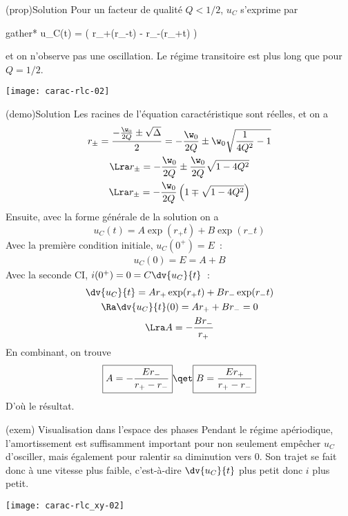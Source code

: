 \documentclass[../../main/main.tex]{subfiles}
\begin{document}
\begin{tcb}[label=prop:solupseudoper, sidebyside](prop){Solution}
	Pour un facteur de qualité $Q < 1/2$, $u_C$ s'exprime par
	\begin{empheq}[box=\fbox]{gather*}
		u_C(t) =  \left( r_+\exp(r_-t) - r_-\exp(r_+t) \right)
	\end{empheq}
	et on n'observe pas une oscillation. Le régime transitoire est plus long que
	pour $Q = 1/2$.
	\tcblower
	\begin{center}
		\texttt{[image: carac-rlc-02]}
	\end{center}
\end{tcb}
\begin{tcb}[label=demo:solupseudoper, sidebyside](demo){Solution}
	Les racines de l'équation caractéristique sont réelles, et on a
	\begin{gather*}
		r_\pm = \frac{- \frac{\w_0}{2Q}\pm\sqrt{\Delta}}{2} = - \frac{\w_0}{2Q}
		\pm \w_0\sqrt{\frac{1}{4Q^2} -1}\\
		\Lra r_\pm = - \frac{\w_0}{2Q} \pm \frac{\w_0}{2Q} \sqrt{1 -
			4Q^2}\\
		\Lra r_\pm = - \frac{\w_0}{2Q} \left( 1 \mp \sqrt{1 -
			4Q^2} \right)
	\end{gather*}
	Ensuite, avec la forme générale de la
	solution on a
	\begin{equation*}
		u_C(t) = A \exp(r_+t) + B\exp(r_-t)
	\end{equation*}
	Avec la première condition initiale, $u_C(0^+) = E$~:
	\begin{gather*}
		u_C(0) = E = A + B
	\end{gather*}
	\tcblower
	Avec la seconde CI, $i(0^+) = 0 = C\dv{u_C}{t}$~:
	\begin{gather*}
		\dv{u_C}{t} = Ar_+ \exp(r_+t) + Br_-\exp(r_-t)\\
		\Ra \dv{u_C}{t} (0) = Ar_+ + Br_- = 0\\
		\Lra A = - \frac{Br_-}{r_+}
	\end{gather*}
	En combinant, on trouve
	\begin{equation*}
		\boxed{A = - \frac{Er_-}{r_+ - r_-}} \qet \boxed{B = \frac{Er_+}{r_+ -
				r_-}}
	\end{equation*}
	D'où le résultat.
\end{tcb}

\begin{tcb}[width=\linewidth, sidebyside, righthand ratio=.4](exem)
	{Visualisation dans l'espace des phases}
	Pendant le régime apériodique, l'amortissement est suffisamment important
	pour non seulement empêcher $u_C$ d'osciller, mais également pour ralentir
	sa diminution vers $0$. Son trajet se fait donc à une vitesse plus faible,
	c'est-à-dire $\dv{u_C}{t}$ plus petit donc $i$ plus petit.
	\tcblower
	\begin{center}
		\texttt{[image: carac-rlc\_xy-02]}
	\end{center}
\end{tcb}
\end{document}
